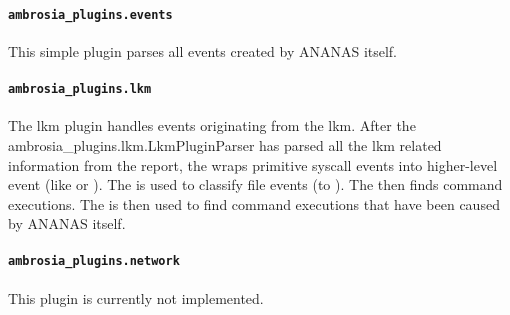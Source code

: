 \documentclass[letterpaper,10pt,english]{sphinxmanual}
\begin{document}
\paragraph{\texttt{ambrosia\_plugins.events}}
\label{server:ambrosia-plugins-events}
This simple plugin parses all events created by ANANAS itself.


\paragraph{\texttt{ambrosia\_plugins.lkm}}
\label{server:ambrosia-plugins-lkm}
The lkm plugin handles events originating from the lkm. After the ambrosia\_plugins.lkm.LkmPluginParser has parsed all
the lkm related information from the report, the {\hyperref[ambrosia_plugins.lkm:ambrosia_plugins.lkm.SyscallCorrelator]{}} wraps primitive syscall
events into higher-level event (like  or
). The {\hyperref[ambrosia_plugins.lkm:ambrosia_plugins.lkm.FileEventCorrelator]{}} is used to
classify file events (to ). The
{\hyperref[ambrosia_plugins.lkm:ambrosia_plugins.lkm.CommandExecuteCorrelator]{}} then finds command executions. The
{\hyperref[ambrosia_plugins.lkm:ambrosia_plugins.lkm.AdbCommandCorrelator]{}} is then used to find command executions that have been caused by
ANANAS itself.


\paragraph{\texttt{ambrosia\_plugins.network}}
\label{server:ambrosia-plugins-network}
This plugin is currently not implemented.
\end{document}
